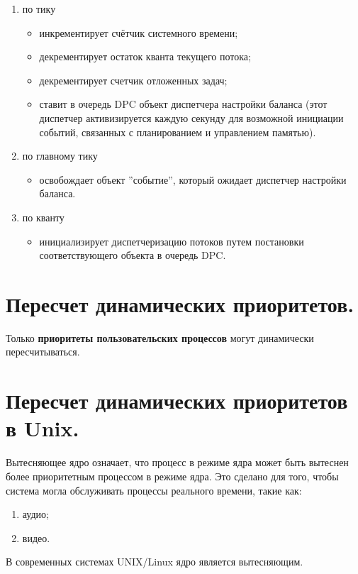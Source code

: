 \begin{enumerate}
	\item по тику
	\begin{itemize}
		\item инкрементирует счётчик системного времени;
		\item декрементирует остаток кванта текущего потока;
		\item декрементирует счетчик отложенных задач;
		\item ставит в очередь DPC объект диспетчера настройки баланса 
		(этот диспетчер активизируется каждую секунду для возможной инициации событий,
		связанных с планированием и управлением памятью).
	\end{itemize}
	\item по главному тику
	\begin{itemize}
		\item освобождает объект ''событие'', который ожидает диспетчер настройки баланса.
	\end{itemize}
	\item по кванту
	\begin{itemize}
		\item инициализирует диспетчеризацию потоков путем постановки соответствующего объекта в очередь DPC.
	\end{itemize}
\end{enumerate}

\section{Пересчет динамических приоритетов.}

Только \textbf{приоритеты пользовательских
процессов} могут динамически пересчитываться.

\section{Пересчет динамических приоритетов в Unix.}

Вытесняющее ядро означает, что процесс в режиме ядра 
может быть вытеснен более приоритетным процессом в режиме ядра.
Это сделано для того, 
чтобы система могла обслуживать процессы реального времени,
такие как:

\begin{enumerate}
	\item аудио;
	\item видео.
\end{enumerate}

В современных системах UNIX/Linux ядро является вытесняющим.

